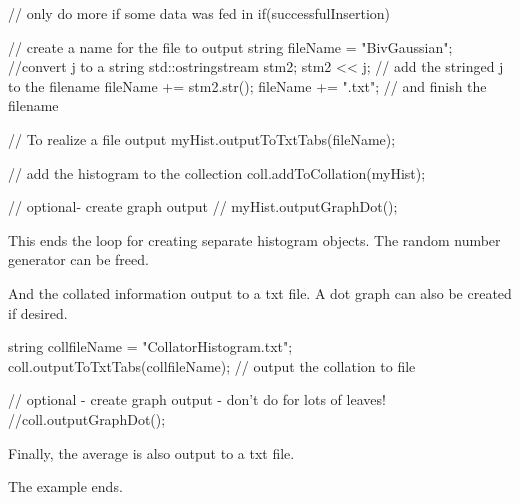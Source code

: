 \begin{DoxyCodeInclude}
        // only do more if some data was fed in
        if(successfulInsertion) {

            // create a name for the file to output
            string fileName = "BivGaussian";
            //convert j to a string
            std::ostringstream stm2;
            stm2 << j;
            // add the stringed j to the filename
            fileName += stm2.str();
            fileName += ".txt"; // and finish the filename

            // To realize a file output
            myHist.outputToTxtTabs(fileName);

            // add the histogram to the collection
            coll.addToCollation(myHist);

            // optional- create graph output
            // myHist.outputGraphDot();
        }

\end{DoxyCodeInclude}


\-This ends the loop for creating separate histogram objects. \-The random number generator can be freed.


\begin{DoxyCodeInclude}
    } // end of for loop creating histograms

    // free the random number generator
    gsl_rng_free (r);

\end{DoxyCodeInclude}


\-And the collated information output to a txt file. \-A dot graph can also be created if desired.


\begin{DoxyCodeInclude}
    string collfileName = "CollatorHistogram.txt";
    coll.outputToTxtTabs(collfileName); // output the collation to file

    // optional - create graph output - don't do for lots of leaves!
    //coll.outputGraphDot();

\end{DoxyCodeInclude}


\-Finally, the average is also output to a txt file.


\begin{DoxyCodeInclude}

\end{DoxyCodeInclude}


\-The example ends.


\begin{DoxyCodeInclude}

\end{DoxyCodeInclude}


